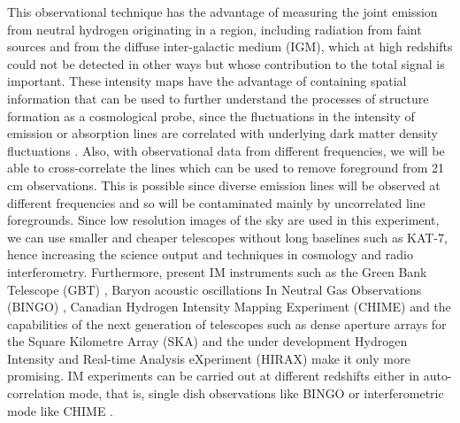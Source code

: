 \documentclass[fleqn,usenatbib]{mnras}
\begin{document}
This observational technique has the advantage of measuring the joint emission from neutral hydrogen originating in a region,
including radiation from faint sources and from the diffuse inter-galactic medium (IGM), which at high redshifts could not be detected in other ways but whose contribution to the total signal is important. These intensity maps have the advantage of containing spatial information that can be used to further understand the processes of structure formation as a cosmological probe, since the fluctuations in the intensity of emission or absorption lines are correlated with underlying dark matter density fluctuations \citep[p. 366]{2009bkk1}. Also, with observational data from different frequencies, 
we will be able to cross-correlate the lines which can be used to remove foreground from 21 cm observations. This is possible since diverse emission lines will be observed at different frequencies and so will be contaminated mainly by uncorrelated line foregrounds. Since low resolution images of the sky are used in this 
experiment, we can use smaller and cheaper telescopes without long baselines such as KAT-7, hence increasing the science output and techniques in cosmology and 
radio interferometry. Furthermore, present IM instruments such as the Green Bank Telescope (GBT) \citep{2010PhRvD..81j3527M}, Baryon acoustic oscillations In Neutral
Gas Observations (BINGO) \citep{2012arXiv1209.1041B}, Canadian Hydrogen Intensity Mapping Experiment (CHIME) \citep{2014SPIE.9145E..22B,2014SPIE.9145E..4VN} and the 
capabilities of the next generation of telescopes such as dense aperture arrays for the Square Kilometre Array (SKA) \citep{Faulkner2011,deVaate2012} and the under
development Hydrogen Intensity and Real-time Analysis eXperiment (HIRAX) \citep{2016arXiv160702059N} make it only more promising. IM experiments can be carried out at
different redshifts either in auto-correlation mode, that is, single dish observations like BINGO  \citep{2012arXiv1209.1041B} or interferometric mode 
like CHIME \citep{2014SPIE.9145E..4VN}.
 
\end{document}
